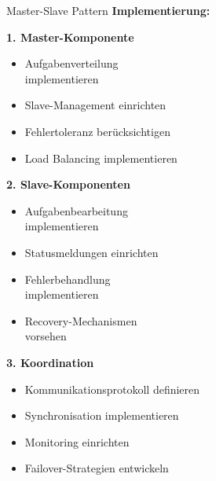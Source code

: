 \begin{KR}{Master-Slave Pattern}
\textbf{Implementierung:}

\begin{minipage}[t]{0.5\textwidth}
\textbf{1. Master-Komponente}
\begin{itemize}
    \item Aufgabenverteilung \\implementieren
    \item Slave-Management einrichten
    \item Fehlertoleranz berücksichtigen
    \item Load Balancing implementieren
\end{itemize}
\end{minipage}
\begin{minipage}[t]{0.5\textwidth}
\textbf{2. Slave-Komponenten}
\begin{itemize}
    \item Aufgabenbearbeitung\\ implementieren
    \item Statusmeldungen einrichten
    \item Fehlerbehandlung \\implementieren
    \item Recovery-Mechanismen\\ vorsehen
\end{itemize}
\end{minipage}

\textbf{3. Koordination}
\begin{itemize}
    \item Kommunikationsprotokoll definieren
    \item Synchronisation implementieren
    \item Monitoring einrichten
    \item Failover-Strategien entwickeln
\end{itemize}

\end{KR}

